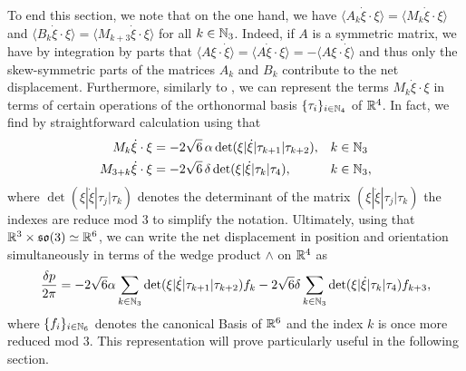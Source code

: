 To end this section, we note that on the one hand, we have $\langle A_k \dot{\xi} \cdot \xi \rangle = \langle M_k \dot{\xi} \cdot \xi \rangle$ and $\langle B_k \dot{\xi} \cdot \xi \rangle = \langle M_{k + 3} \dot{\xi} \cdot \xi \rangle$ for all $k \in \mathbb{N}_3$. Indeed, if $A$ is a symmetric matrix, we have by integration by parts that $\langle A \xi \cdot \dot{\xi} \rangle = \langle A \dot{\xi} \cdot \xi \rangle = - \langle A \xi \cdot \dot{\xi} \rangle $ and thus only the skew-symmetric parts of the matrices $A_k$ and $B_k$ contribute to the net displacement. Furthermore, similarly to \cite{Alouges2017}, we can represent the terms $ M_k \dot{\xi} \cdot \xi$ in terms of certain operations of the orthonormal basis $\{\tau_i\}_{i \in \mathbb{N}_4}$ of $\mathbb{R}^4$. In fact, we find by straightforward calculation using  that
\begin{align}
  M_k \dot{\xi} \cdot \xi &= - 2 \sqrt{6} \,\alpha \det( \xi | \dot{\xi} | \tau_{k+1} | \tau_{k+2}), & & k \in \mathbb{N}_3 \\
  M_{3 + k} \dot{\xi} \cdot \xi &= - 2 \sqrt{6} \,\delta \det ( \xi | \dot{\xi} | \tau_{k} | \tau_{4}), & & k \in \mathbb{N}_3,
\end{align}
where $\det(\xi|\dot{\xi}|\tau_j|\tau_k)$ denotes the determinant of the matrix $(\xi|\dot{\xi}|\tau_j |\tau_k)$ the indexes are reduce mod 3 to simplify the notation. Ultimately, using that $\mathbb{R}^3 \times \mathfrak{so}(3) \simeq \mathbb{R}^6$, we can write the net displacement in position and orientation simultaneously in terms of the wedge product $\wedge$ on $\mathbb{R}^4$ as
\begin{equation}
\label{eq: net displacement}
\frac{\delta p}{2 \pi}= - 2  \sqrt{6} \alpha \sum_{k \in \mathbb{N}_3} \det( \xi | \dot{\xi} | \tau_{k+1} | \tau_{k+2}) f_k  - 2  \sqrt{6} \delta \sum_{k \in \mathbb{N}_3} \det ( \xi | \dot{\xi} | \tau_{k} | \tau_{4}) f_{k + 3},
\end{equation}
where $\{f_i\}_{i \in \mathbb{N}_6}$ denotes the canonical Basis of $\mathbb{R}^6$ and the index $k$ is once more reduced mod 3. This representation will prove particularly useful in the following section.